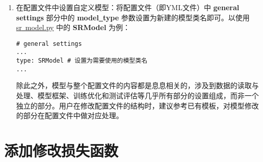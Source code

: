 \documentclass[../main.tex]{subfiles}
\begin{document}
\begin{enumerate}
	\item 在配置文件中设置自定义模型：将配置文件（即YML文件）中 \textbf{general settings} 部分中的 \textbf{model\underline{~}type} 参数设置为新建的模型类名即可。以使用 \href{https://github.com/XPixelGroup/BasicSR/tree/master/basicsr/models/sr_model.py}{sr\underline{~}model.py} 中的 \textbf{SRModel} 为例：
\begin{verbatim}
# general settings
...
type: SRModel # 设置为需要使用的模型类名
...
\end{verbatim}
除此之外，模型与整个配置文件的内容都是息息相关的，涉及到数据的读取与处理、模型框架、训练优化和测试评估等几乎所有部分的设置组成，而非一个独立的部分。用户在修改配置文件的结构时，建议参考已有模板，对模型修改的部分在配置文件中做对应处理。

\end{enumerate}

\section{添加修改损失函数}
\end{document}
